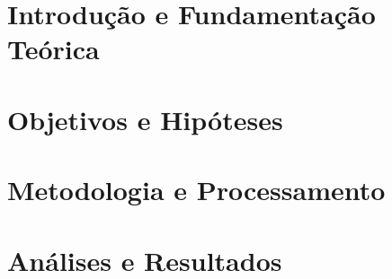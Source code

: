 \documentclass[
  12pt,
  openany,
  twoside,
  a4paper,
  english,
  brazil
]{abntex2}
\begin{document}
\tableofcontents*
\cleardoublepage

\textual
{}
\setcounter{page}{1}

\part{Introdução e Fundamentação Teórica}


\part{Objetivos e Hipóteses}



\part{Metodologia e Processamento}



\part{Análises e Resultados}
 







\postextual




% 
% 

\end{document}
